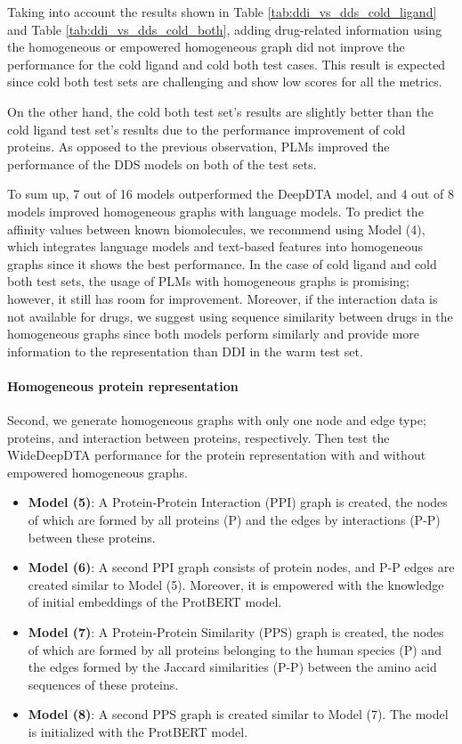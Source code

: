 Taking into account the results shown in Table \ref{tab:ddi_vs_dds_cold_ligand} and Table \ref{tab:ddi_vs_dds_cold_both}, adding drug-related information using the homogeneous or empowered homogeneous graph did not improve the performance for the cold ligand and cold both test cases. This result is expected since cold both test sets are challenging and show low scores for all the metrics. 

On the other hand, the cold both test set's results are slightly better than the cold ligand test set's results due to the performance improvement of cold proteins. As opposed to the previous observation, PLMs improved the performance of the DDS models on both of the test sets. 




\newpage
To sum up, 7 out of 16 models outperformed the DeepDTA model, and 4 out of 8 models improved homogeneous graphs with language models. To predict the affinity values between known biomolecules, we recommend using Model (4), which integrates language models and text-based features into homogeneous graphs since it shows the best performance. In the case of cold ligand and cold both test sets, the usage of PLMs with homogeneous graphs is promising; however, it still has room for improvement. Moreover, if the interaction data is not available for drugs, we suggest using sequence similarity between drugs in the homogeneous graphs since both models perform similarly and provide more information to the representation than DDI in the warm test set.  

\paragraph{Homogeneous protein representation}
Second, we generate homogeneous graphs with only one node and edge type; proteins, and interaction between proteins, respectively. Then test the WideDeepDTA performance for the protein representation with and without empowered homogeneous graphs.

\begin{itemize}
    \item \textbf{Model (5)}: A Protein-Protein Interaction (PPI) graph is created, the nodes of which are formed by all proteins (P) and the edges by interactions (P-P) between these proteins.   
    \item \textbf{Model (6)}: A second PPI graph consists of protein nodes, and P-P edges are created similar to Model (5). Moreover, it is empowered with the knowledge of initial embeddings of the ProtBERT model.
    \item \textbf{Model (7)}: A Protein-Protein Similarity (PPS) graph is created, the nodes of which are formed by all proteins belonging to the human species (P) and the edges formed by the Jaccard similarities (P-P) between the amino acid sequences of these proteins.
    \item \textbf{Model (8)}: A second PPS graph is created similar to Model (7). The model is initialized with the ProtBERT model.
\end{itemize}

